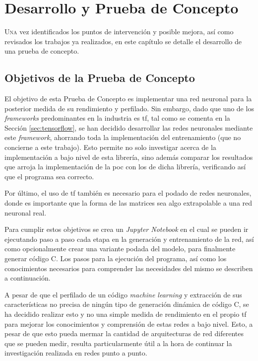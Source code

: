 \chapter{Desarrollo y Prueba de Concepto}
\label{chap:desarrollo_poc}

\lettrine{U}{na} vez identificados los puntos de intervención y posible mejora, así como revisados los trabajos ya realizados, en este capítulo se detalle el desarrollo de una prueba de concepto.


\section{Objetivos de la Prueba de Concepto}
\label{sec:objetivos_poc}
El objetivo de esta Prueba de Concepto es implementar una red neuronal para la posterior medida de su rendimiento y perfilado. Sin embargo, dado que uno de los \textit{frameworks} predominantes en la industria es \acrlong{tf}, tal como se comenta en la Sección \ref{sec:tensorflow}, se han decidido desarrollar las redes neuronales mediante este \textit{framework}, ahorrando toda la implementación del entrenamiento (que no concierne a este trabajo). Esto permite no solo investigar acerca de la implementación a bajo nivel de esta librería, sino además comparar los resultados que arroja la implementación de la \acrshort{poc} con los de dicha librería, verificando así que el programa sea correcto.

Por último, el uso de \acrlong{tf} también es necesario para el podado de redes neuronales, donde es importante que la forma de las matrices sea algo extrapolable a una red neuronal real.

Para cumplir estos objetivos se crea un \textit{Jupyter Notebook} en el cual se pueden ir ejecutando paso a paso cada etapa en la generación y entrenamiento de la red, así como opcionalmente crear una variante podada del modelo, para finalmente generar código C. Los pasos para la ejecución del programa, así como los conocimientos necesarios para comprender las necesidades del mismo se describen a continuación.

A pesar de que el perfilado de un código \textit{machine learning} y extracción de sus características no precisa de ningún tipo de generación dinámica de código C, se ha decidido realizar esto y no una simple medida de rendimiento en el propio \acrlong{tf} para mejorar los conocimientos y comprensión de estas redes a bajo nivel. Esto, a pesar de que esto pueda mermar la cantidad de arquitecturas de red diferentes que se pueden medir, resulta particularmente útil a la hora de continuar la investigación realizada en redes punto a punto. 

